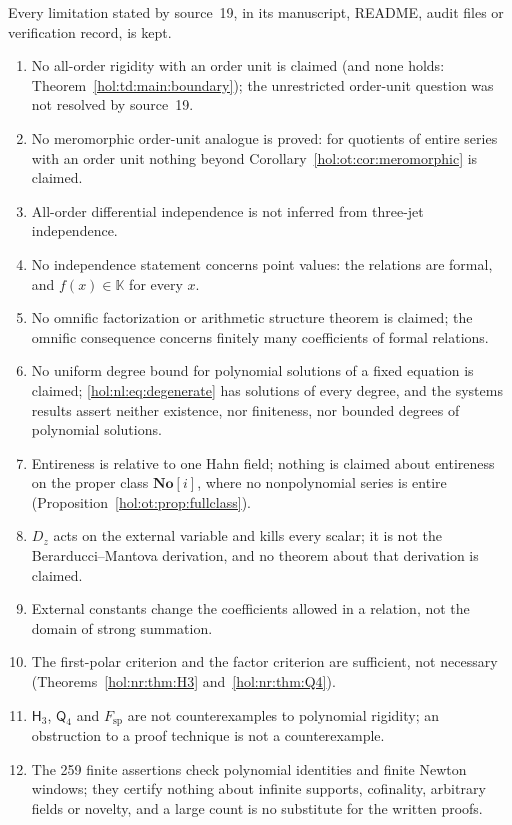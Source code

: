 \documentclass[11pt]{article}
\numberwithin{equation}{section}
\theoremstyle{definition}
\theoremstyle{remark}
\newcommand{\No}{\mathbf{No}}
\newcommand{\KK}{\mathbb K}
\begin{document}
Every limitation stated by source~19, in its manuscript, README, audit files or
verification record, is kept.
\begin{enumerate}[label=\textup{(R\arabic*)}]
\item No all-order rigidity with an order unit is claimed (and none holds:
Theorem~\ref{hol:td:main:boundary}); the unrestricted order-unit question was
not resolved by source~19.
\item No meromorphic order-unit analogue is proved: for quotients of entire
series with an order unit nothing beyond
Corollary~\ref{hol:ot:cor:meromorphic} is claimed.
\item All-order differential independence is not inferred from three-jet
independence.
\item No independence statement concerns point values: the relations are
formal, and $f(x)\in\KK$ for every $x$.
\item No omnific factorization or arithmetic structure theorem is claimed; the
omnific consequence concerns finitely many coefficients of formal relations.
\item No uniform degree bound for polynomial solutions of a fixed equation is
claimed; \eqref{hol:nl:eq:degenerate} has solutions of every degree, and the
systems results assert neither existence, nor finiteness, nor bounded
degrees of polynomial solutions.
\item Entireness is relative to one Hahn field; nothing is claimed about
entireness on the proper class $\No[i]$, where no nonpolynomial series is
entire (Proposition~\ref{hol:ot:prop:fullclass}).
\item $D_z$ acts on the external variable and kills every scalar; it is not the
Berarducci--Mantova derivation, and no theorem about that derivation is
claimed.
\item External constants change the coefficients allowed in a relation, not
the domain of strong summation.
\item The first-polar criterion and the factor criterion are sufficient, not
necessary (Theorems~\ref{hol:nr:thm:H3} and~\ref{hol:nr:thm:Q4}).
\item $\mathsf H_3$, $\mathsf Q_4$ and $F_{\mathrm{sp}}$ are not counterexamples to
polynomial rigidity; an obstruction to a proof technique is not a
counterexample.
\item The 259 finite assertions check polynomial identities and finite Newton
windows; they certify nothing about infinite supports, cofinality, arbitrary
fields or novelty, and a large count is no substitute for the written proofs.

\end{enumerate}
\end{document}
